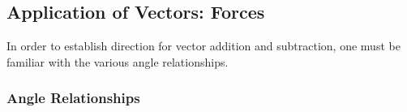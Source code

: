 \subsection{Application of Vectors: Forces}

In order to establish direction for vector addition and subtraction, one must be familiar with the various angle relationships.

\subsubsection{Angle Relationships}

\begingroup
\setlength{\columnsep}{1.0cm}
\setlength{\multicolsep}{0.4em}
\setlength{\parskip}{0.15em}
\raggedcolumns


